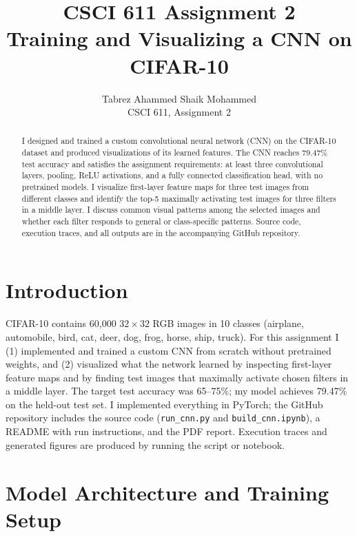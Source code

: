 \documentclass[11pt]{article}
\title{CSCI 611 Assignment 2\\Training and Visualizing a CNN on CIFAR-10}
\author{Tabrez Ahammed Shaik Mohammed\\[0.5em]\normalsize CSCI 611, Assignment 2}
\date{}
\begin{document}
\maketitle

\begin{abstract}
I designed and trained a custom convolutional neural network (CNN) on the CIFAR-10 dataset and produced visualizations of its learned features. The CNN reaches 79.47\% test accuracy and satisfies the assignment requirements: at least three convolutional layers, pooling, ReLU activations, and a fully connected classification head, with no pretrained models. I visualize first-layer feature maps for three test images from different classes and identify the top-5 maximally activating test images for three filters in a middle layer. I discuss common visual patterns among the selected images and whether each filter responds to general or class-specific patterns. Source code, execution traces, and all outputs are in the accompanying GitHub repository.
\end{abstract}

\section{Introduction}

CIFAR-10 contains 60,000 $32\times32$ RGB images in 10 classes (airplane, automobile, bird, cat, deer, dog, frog, horse, ship, truck). For this assignment I (1) implemented and trained a custom CNN from scratch without pretrained weights, and (2) visualized what the network learned by inspecting first-layer feature maps and by finding test images that maximally activate chosen filters in a middle layer. The target test accuracy was 65--75\%; my model achieves 79.47\% on the held-out test set. I implemented everything in PyTorch; the GitHub repository includes the source code (\texttt{run\_cnn.py} and \texttt{build\_cnn.ipynb}), a README with run instructions, and the PDF report. Execution traces and generated figures are produced by running the script or notebook.

\section{Model Architecture and Training Setup}
\end{document}
